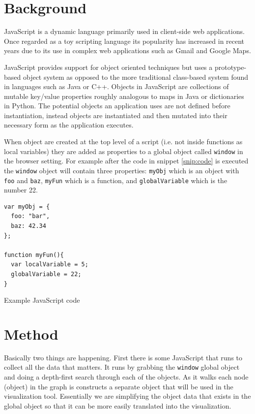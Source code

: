 \documentclass[]{article}
\begin{document}
\section{Background}
\label{sec:background}
JavaScript \cite{ECMA-262} is a dynamic language primarily used in client-side web applications. Once regarded as a toy scripting language its popularity has increased in recent years due to its use in complex web applications such as Gmail and Google Maps.

JavaScript provides support for object oriented techniques but uses a prototype-based object system as opposed to the more traditional class-based system found in languages such as Java or C++. Objects in JavaScript are collections of mutable key/value properties roughly analogous to maps in Java or dictionaries in Python. The potential objects an application uses are not defined before instantiation, instead objects are instantiated and then mutated into their necessary form as the application executes.

When object are created at the top level of a script (i.e. not inside functions as local variables) they are added as properties to a global object called {\tt window} in the browser setting. For example after the code in snippet \ref{snip:code} is executed the {\tt window} object will contain three properties: {\tt myObj} which is an object with {\tt foo} and {\tt baz}, {\tt myFun} which is a function, and {\tt globalVariable} which is the number 22.

\begin{program}[here]
\begin{verbatim}
var myObj = {
  foo: "bar",
  baz: 42.34
};

function myFun(){
  var localVariable = 5;
  globalVariable = 22;
}
\end{verbatim}
\caption{Example JavaScript code}
\label{snip:code}
\end{program}


\section{Method}
\label{sec:method}
Basically two things are happening. First there is some JavaScript that runs to collect all the data that matters. It runs by grabbing the {\tt window} global object and doing a depth-first search through each of the objects. As it walks each node (object) in the graph is constructs a separate object that will be used in the visualization tool. Essentially we are simplifying the object data that exists in the global object so that it can be more easily translated into the visualization.
\end{document}
